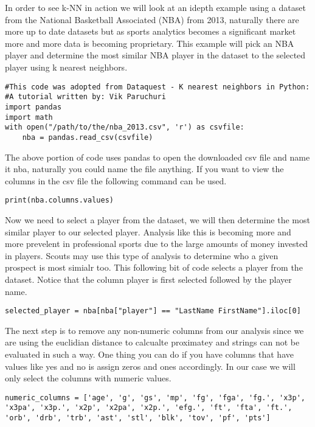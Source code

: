  

In order to see k-NN in action we will look at an idepth example using
a dataset from the National Basketball Associated (NBA) from 2013,
naturally there are more up to date datasets but as sports analytics
becomes a significant market more and more data is becoming
proprietary. This example will pick an NBA player and determine the
most similar NBA player in the dataset to the selected player using
k nearest neighbors. 

\begin{lstlisting}
#This code was adopted from Dataquest - K nearest neighbors in Python:
#A tutorial written by: Vik Paruchuri
import pandas
import math
with open("/path/to/the/nba_2013.csv", 'r') as csvfile:
    nba = pandas.read_csv(csvfile)
\end{lstlisting}

The above portion of code uses pandas to open the downloaded csv file
and name it nba, naturally you could name the file anything. If you
want to view the columns in the csv file the following command can be
used.

\begin{lstlisting}
print(nba.columns.values)
\end{lstlisting} 

Now we need to select a player from the dataset, we will then
determine the most similar player to our selected player. Analysis
like this is becoming more and more prevelent in professional sports
due to the large amounts of money invested in players. Scouts may use
this type of analysis to determine who a given prospect is most
simialr too. This following bit of code selects a player from the
dataset. Notice that the column player is first selected followed by
the player name.  

\begin{lstlisting}
selected_player = nba[nba["player"] == "LastName FirstName"].iloc[0]
\end{lstlisting} 

The next step is to remove any non-numeric columns from our analysis
since we are using the euclidian distance to calcualte proximatey and
strings can not be evaluated in such a way. One thing you can do if
you have columns that have values like yes and no is assign zeros and
ones accordingly. In our case we will only select the columns with
numeric values. 

\begin{lstlisting}
numeric_columns = ['age', 'g', 'gs', 'mp', 'fg', 'fga', 'fg.', 'x3p',
'x3pa', 'x3p.', 'x2p', 'x2pa', 'x2p.', 'efg.', 'ft', 'fta', 'ft.',
'orb', 'drb', 'trb', 'ast', 'stl', 'blk', 'tov', 'pf', 'pts']
\end{lstlisting} 

